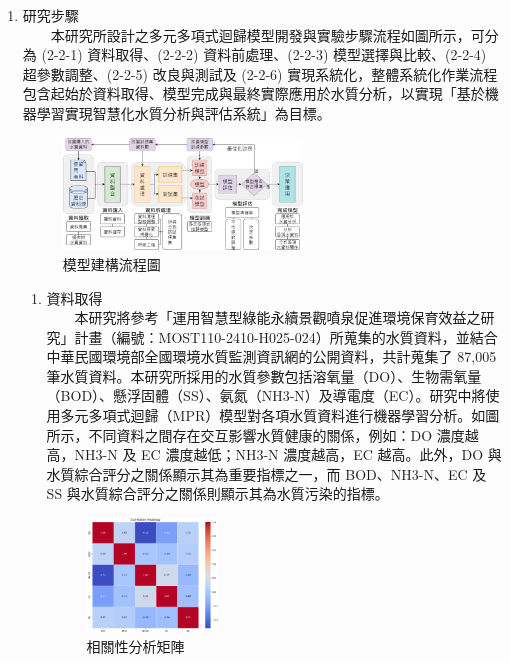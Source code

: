 \documentclass[12pt,a4paper]{article}
\begin{document}
\begin{enumerate}
\begin{enumerate}[label=\arabic*.]
\begin{enumerate}[label=2-1-\arabic*.]
    \end{enumerate}
\item 研究步驟\\
　　本研究所設計之多元多項式迴歸模型開發與實驗步驟流程如圖所示，可分為 (2-2-1) 資料取得、(2-2-2) 資料前處理、(2-2-3) 模型選擇與比較、(2-2-4) 超參數調整、(2-2-5) 改良與測試及 (2-2-6) 實現系統化，整體系統化作業流程包含起始於資料取得、模型完成與最終實際應用於水質分析，以實現「基於機器學習實現智慧化水質分析與評估系統」為目標。
    \begin{figure}[H]
        \centering
        \includegraphics[width=0.6\textwidth]{resources/image/模型建構流程圖.png}
        \caption{模型建構流程圖}
        \label{fig:research_steps}
    \end{figure}
    \begin{enumerate}[label=2-2-\arabic*.]
        \item 資料取得\\
        　　本研究將參考「運用智慧型綠能永續景觀噴泉促進環境保育效益之研究」計畫（編號：MOST110-2410-H025-024）所蒐集的水質資料，並結合中華民國環境部全國環境水質監測資訊網的公開資料，共計蒐集了 87,005 筆水質資料。本研究所採用的水質參數包括溶氧量（DO）、生物需氧量（BOD）、懸浮固體（SS）、氨氮（NH3-N）及導電度（EC）。研究中將使用多元多項式迴歸（MPR）模型對各項水質資料進行機器學習分析。如圖所示，不同資料之間存在交互影響水質健康的關係，例如：DO 濃度越高，NH3-N 及 EC 濃度越低；NH3-N 濃度越高，EC 越高。此外，DO 與水質綜合評分之關係顯示其為重要指標之一，而 BOD、NH3-N、EC 及 SS 與水質綜合評分之關係則顯示其為水質污染的指標。
            \begin{figure}[H]
                \centering
                \includegraphics[width=0.35\textwidth]{resources/image/heatmap.png}
                \caption{相關性分析矩陣}

\end{figure}
\end{enumerate}
\end{enumerate}
\end{enumerate}
\end{document}
